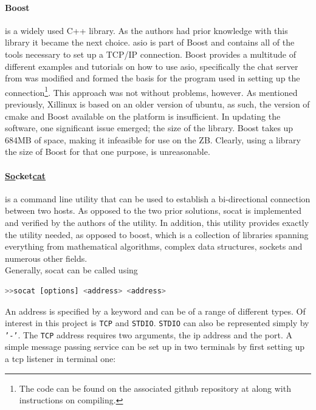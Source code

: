 \paragraph*{Boost}is a widely used C++ library.
As the authors had prior knowledge with this library it became the next choice.
asio is part of Boost and contains all of the tools necessary to set up a TCP/IP connection.
Boost provides a multitude of different examples and tutorials on how to use asio, specifically the chat server from \cite{boostchat} was modified and formed the basis for the program used in setting up the connection\footnote{The code can be found on the associated github repository at  along with instructions on compiling.}.
This approach was not without problems, however.
As mentioned previously, Xillinux is based on an older version of ubuntu, as such, the version of cmake and Boost available on the platform is insufficient.
In updating the software, one significant issue emerged; the size of the library.
Boost takes up 684MB of space, making it infeasible for use on the ZB.
Clearly, using a library the size of Boost for that one purpose, is unreasonable.

\paragraph*{\underline{So}cket\underline{cat}} is a command line utility that can be used to establish a bi-directional connection between two hosts.
As opposed to the two prior solutions, socat is implemented and verified by the authors of the utility.
In addition, this utility provides exactly the utility needed, as opposed to boost, which is a collection of libraries spanning everything from mathematical algorithms, complex data structures, sockets and numerous other fields.\\
Generally, socat can be called using
\begin{lstlisting}[language=bash]
>>socat [options] <address> <address>
\end{lstlisting}
An address is specified by a keyword and can be of a range of different types.
Of interest in this project is \texttt{TCP} and \texttt{STDIO}.
\texttt{STDIO} can also be represented simply by \texttt{'-'}.
The \texttt{TCP} address requires two arguments, the ip address and the port.
A simple message passing service can be set up in two terminals by first setting up a tcp listener in terminal one:

